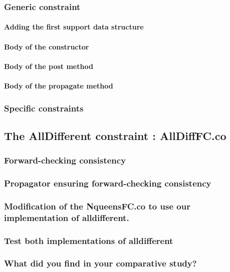\documentclass{eplDoc}
\begin{document}
\subsubsection{Generic constraint}

\paragraph{Adding the first support data structure}

\paragraph{Body of the constructor}

\paragraph{Body of the post method}

\paragraph{Body of the propagate method}

\subsubsection{Specific constraints}

\subsection{The AllDifferent constraint : AllDiffFC.co} %

\subsubsection{Forward-checking consistency}

\subsubsection{Propagator ensuring forward-checking consistency}

\subsubsection{Modification of the NqueensFC.co to use our implementation of alldifferent.}

\subsubsection{Test both implementations of alldifferent}

\subsubsection{What did you find in your comparative study?}
\end{document}
